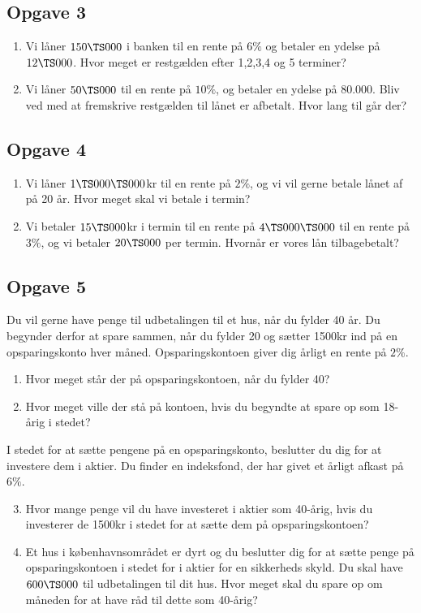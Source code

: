 \subsection*{Opgave 3}
\begin{enumerate}[label=\roman*)]
\item Vi låner $150 \TS000$ i banken til en rente på $6\%$ og betaler en ydelse på $12 \TS 000$. Hvor meget er restgælden efter 1,2,3,4 og 5 terminer?
\item Vi låner $50 \TS 000$ til en rente på $10\%$, og betaler en ydelse på 80.000. Bliv ved med at fremskrive restgælden til lånet er afbetalt. Hvor lang til går der?
\end{enumerate}

\subsection*{Opgave 4}
\begin{enumerate}[label=\roman*)]
\item Vi låner $1\TS 000 \TS 000 $kr til en rente på $2\%$, og vi vil gerne betale lånet af på 20 år. Hvor meget skal vi betale i termin?
\item Vi betaler $15 \TS 000$kr i termin til en rente på $4\TS 000 \TS 000$ til en rente på $3\%$, og vi betaler $20 \TS 000$ per termin. Hvornår er vores lån tilbagebetalt?
\end{enumerate}

\subsection*{Opgave 5}
Du vil gerne have penge til udbetalingen til et hus, når du fylder 40 år. Du begynder derfor at spare sammen, når du fylder 20 og sætter 1500kr ind på en opsparingskonto hver måned. Opsparingskontoen giver dig årligt en rente på $2\%$.
\begin{enumerate}[label=\roman*)]
	\item Hvor meget står der på opsparingskontoen, når du fylder 40?
	\item Hvor meget ville der stå på kontoen, hvis du begyndte at spare op som 18-årig i stedet?
\end{enumerate}
I stedet for at sætte pengene på en opsparingskonto, beslutter du dig for at investere dem i aktier. Du finder en indeksfond, der har givet et årligt afkast på $6\%$. 
\begin{enumerate}[label=\roman*)]
	\setcounter{enumi}{2}
	\item Hvor mange penge vil du have investeret i aktier som 40-årig, hvis du investerer de 1500kr 
	i stedet for at sætte dem på opsparingskontoen?
	\item Et hus i københavnsområdet er dyrt og du beslutter dig for at sætte penge på opsparingskontoen i stedet for i aktier for en sikkerheds skyld. Du skal have $600\TS 000$ til udbetalingen til dit hus. Hvor meget skal du spare op om måneden for at have råd til dette som 40-årig?
\end{enumerate}

